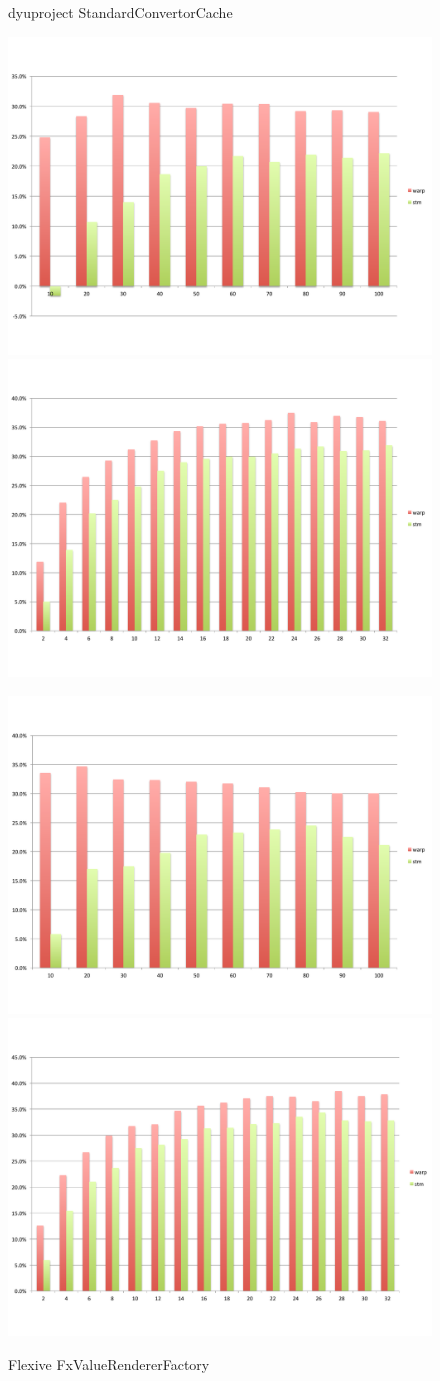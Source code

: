 \begin{figure}
\begin{minipage}{0.5 \textwidth}
		\caption{\label{Fi:case2th}dyuproject {\sf StandardConvertorCache}}
	\end{minipage}
	\begin{minipage}{0.5 \textwidth}
		\includegraphics[width=0.5 \textwidth]{../../eval/32threads/case3it.pdf}\includegraphics[width=0.5 \textwidth]{../../eval/32threads/case3th.pdf}
		\caption{\label{Fi:case3th}Flexive {\sf FxValueRendererFactory}}
	\end{minipage}
	\begin{minipage}{0.5 \textwidth}
		\includegraphics[width=0.5 \textwidth]{../../eval/32threads/case4it.pdf}\includegraphics[width=0.5 \textwidth]{../../eval/32threads/case4th.pdf}

\end{minipage}
\end{figure}
